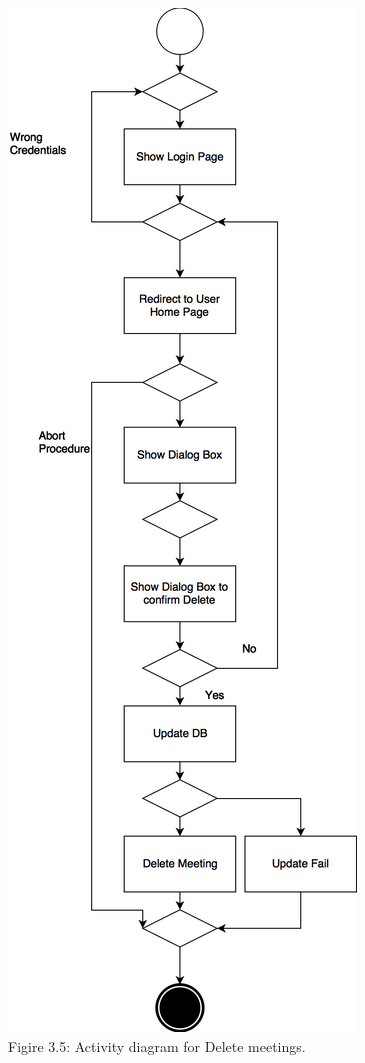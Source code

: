 \documentclass{article}
\begin{document}
	\begin{center}
		\includegraphics[scale=0.25]{img/diagrams/delete_meetings_ad.png} \\ \bigskip
		Figire 3.5: Activity diagram for Delete meetings.
	\end{center}
	\newpage
\end{document}
